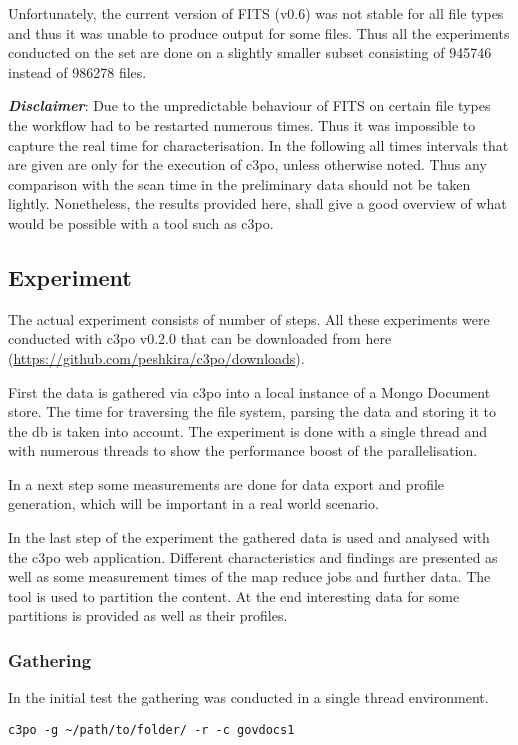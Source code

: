 Unfortunately, the current version of FITS (v0.6) was not stable for all file types and thus it was unable to produce output for some files. Thus all the experiments conducted on the set are done on a slightly smaller subset consisting of 945746 instead of 986278 files.

\textbf{\textit{Disclaimer}}: Due to the unpredictable behaviour of FITS on certain file types the workflow had to be restarted numerous times. Thus it was impossible to capture the real time for characterisation. In the following all times intervals that are given are only for the execution of c3po, unless otherwise noted. Thus any comparison with the scan time in the preliminary data should not be taken lightly. Nonetheless, the results provided here, shall give a good overview of what would be possible with a tool such as c3po.

\subsection{Experiment}
The actual experiment consists of number of steps. All these experiments were conducted with c3po v0.2.0 that can be downloaded from here (\url{https://github.com/peshkira/c3po/downloads}). 

First the data is gathered via c3po into a local instance of a Mongo Document store. The time for traversing the file system, parsing the data and storing it to the db is taken into account. The experiment is done with a single thread and with numerous threads to show the performance boost of the parallelisation.

In a next step some measurements are done for data export and profile generation, which will be important in a real world scenario.

In the last step of the experiment the gathered data is used and analysed with the c3po web application. Different characteristics and findings are presented as well as some measurement times of the map reduce jobs and further data. The tool is used to partition the content. At the end interesting data for some partitions is provided as well as their profiles.

\subsubsection{Gathering}
In the initial test the gathering was conducted in a single thread environment. 

\begin{verbatim}
c3po -g ~/path/to/folder/ -r -c govdocs1
\end{verbatim}

